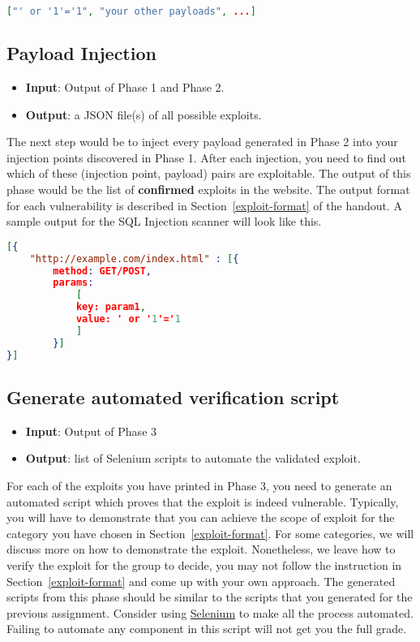 \documentclass{article}[10pt]
\begin{document}
\begin{lstlisting}[language=json,firstnumber=1]
["' or '1'='1", "your other payloads", ...]
\end{lstlisting}

\subsection{Payload Injection}
\begin{itemize}
	\item \textbf{Input}: Output of Phase 1 and Phase 2.
	\item \textbf{Output}: a JSON file(s) of all possible exploits.
\end{itemize}
The next step would be to inject every payload generated in Phase 2 into your injection points discovered in Phase 1. After each injection, you need to find out which of these (injection point, payload) pairs are exploitable. The output of this phase would be the list of \textbf{confirmed} exploits in the website. The output format for each vulnerability is described in Section~\ref{exploit-format} of the handout. A sample output for the SQL Injection scanner will look like this.
\begin{lstlisting}[language=json,firstnumber=1]
[{
	"http://example.com/index.html" : [{
		method: GET/POST,
		params: 
			[
			key: param1,
			value: ' or '1'='1
			]
		}]
}]
\end{lstlisting}

\subsection{Generate automated verification script} 
\begin{itemize}
	\item \textbf{Input}: Output of Phase 3
	\item \textbf{Output}: list of Selenium scripts to automate the validated exploit.
\end{itemize}
For each of the exploits you have printed in Phase 3, you need to generate an
automated script which proves that the exploit is indeed vulnerable. Typically, you will have to demonstrate that you can achieve the scope of exploit for the category you have chosen in Section~\ref{exploit-format}. 
For some categories, we will discuss more on how to demonstrate the exploit. Nonetheless, we leave how to verify the exploit for the group to decide, you may not follow the instruction in Section~\ref{exploit-format} and come up with your own approach. The
generated scripts from this phase should be similar to the scripts that you
generated for the previous assignment. Consider using
\href{http://www.seleniumhq.org/}{Selenium} to make all the process automated.
Failing to automate any component in this script will not get you the full grade.
\end{document}
